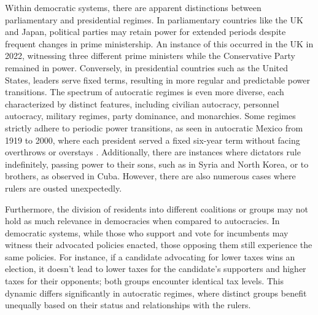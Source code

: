 \documentclass[
  12pt,
  a4paper,
  12pt]{article}
\begin{document}
Within democratic systems, there are apparent distinctions between
parliamentary and presidential regimes. In parliamentary countries like
the UK and Japan, political parties may retain power for extended
periods despite frequent changes in prime ministership. An instance of
this occurred in the UK in 2022, witnessing three different prime
ministers while the Conservative Party remained in power. Conversely, in
presidential countries such as the United States, leaders serve fixed
terms, resulting in more regular and predictable power transitions. The
spectrum of autocratic regimes is even more diverse, each characterized
by distinct features, including civilian autocracy, personnel autocracy,
military regimes, party dominance, and monarchies. Some regimes strictly
adhere to periodic power transitions, as seen in autocratic Mexico from
1919 to 2000, where each president served a fixed six-year term without
facing overthrows or overstays \citep{klesner2019}. Additionally, there
are instances where dictators rule indefinitely, passing power to their
sons, such as in Syria and North Korea, or to brothers, as observed in
Cuba. However, there are also numerous cases where rulers are ousted
unexpectedly.

Furthermore, the division of residents into different coalitions or
groups may not hold as much relevance in democracies when compared to
autocracies. In democratic systems, while those who support and vote for
incumbents may witness their advocated policies enacted, those opposing
them still experience the same policies. For instance, if a candidate
advocating for lower taxes wins an election, it doesn't lead to lower
taxes for the candidate's supporters and higher taxes for their
opponents; both groups encounter identical tax levels. This dynamic
differs significantly in autocratic regimes, where distinct groups
benefit unequally based on their status and relationships with the
rulers.
\end{document}
